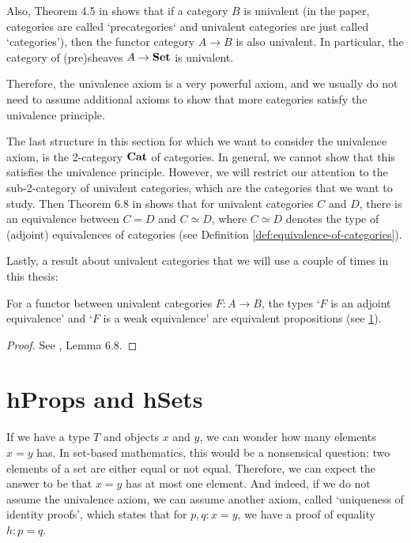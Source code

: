 Also, Theorem 4.5 in \autocite{univalent-categories} shows that if a category $ B $ is univalent (in the paper, categories are called `precategories` and univalent categories are just called `categories'), then the functor category $ A \rightarrow B $ is also univalent. In particular, the category of (pre)sheaves $ A \to \mathbf{Set} $ is univalent.

Therefore, the univalence axiom is a very powerful axiom, and we usually do not need to assume additional axioms to show that more categories satisfy the univalence principle.

The last structure in this section for which we want to consider the univalence axiom, is the 2-category $ \mathbf{Cat} $ of categories. In general, we cannot show that this satisfies the univalence principle. However, we will restrict our attention to the sub-2-category of univalent categories, which are the categories that we want to study. Then Theorem 6.8 in \autocite{univalent-categories} shows that for univalent categories $ C $ and $ D $, there is an equivalence between $ C = D $ and $ C \simeq D $, where $ C \simeq D $ denotes the type of (adjoint) equivalences of categories (see Definition \ref{def:equivalence-of-categories}).

Lastly, a result about univalent categories that we will use a couple of times in this thesis:
\begin{lemma}\label{lem:univalen-category-equivalence}
  For a functor between univalent categories $ F: A \to B $, the types `$ F $ is an adjoint equivalence' and `$ F $ is a weak equivalence' are equivalent propositions (see \ref{sec:homotopy-props-sets}).
\end{lemma}
\begin{proof}
  See \autocite{univalent-categories}, Lemma 6.8.
\end{proof}

\section{hProps and hSets}\label{sec:homotopy-props-sets}
If we have a type $ T $ and objects $ x $ and $ y $, we can wonder how many elements $ x = y $ has. In set-based mathematics, this would be a nonsensical question: two elements of a set are either equal or not equal. Therefore, we can expect the answer to be that $ x = y $ has at most one element. And indeed, if we do not assume the univalence axiom, we can assume another axiom, called `uniqueness of identity proofs', which states that for $ p, q: x = y $, we have a proof of equality $ h: p = q $.

